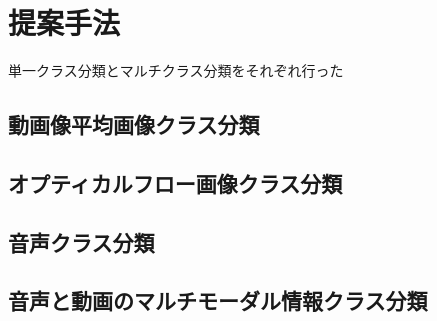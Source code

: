 \section{提案手法}
単一クラス分類とマルチクラス分類をそれぞれ行った
\subsection{動画像平均画像クラス分類}
\subsection{オプティカルフロー画像クラス分類}
\subsection{音声クラス分類}
\subsection{音声と動画のマルチモーダル情報クラス分類}

